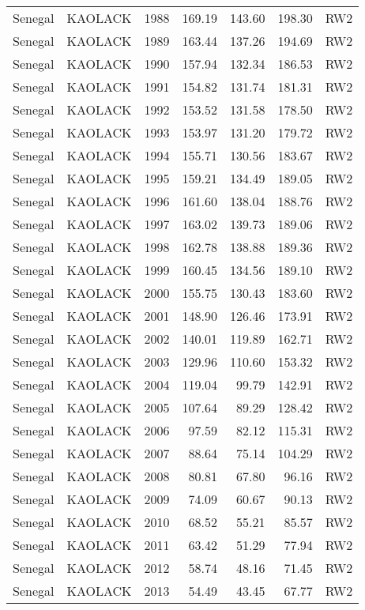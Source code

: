 \begin{longtable}{lllrrrl}
  Senegal & KAOLACK & 1988 & 169.19 & 143.60 & 198.30 & RW2 \\ 
  Senegal & KAOLACK & 1989 & 163.44 & 137.26 & 194.69 & RW2 \\ 
  Senegal & KAOLACK & 1990 & 157.94 & 132.34 & 186.53 & RW2 \\ 
  Senegal & KAOLACK & 1991 & 154.82 & 131.74 & 181.31 & RW2 \\ 
  Senegal & KAOLACK & 1992 & 153.52 & 131.58 & 178.50 & RW2 \\ 
  Senegal & KAOLACK & 1993 & 153.97 & 131.20 & 179.72 & RW2 \\ 
  Senegal & KAOLACK & 1994 & 155.71 & 130.56 & 183.67 & RW2 \\ 
  Senegal & KAOLACK & 1995 & 159.21 & 134.49 & 189.05 & RW2 \\ 
  Senegal & KAOLACK & 1996 & 161.60 & 138.04 & 188.76 & RW2 \\ 
  Senegal & KAOLACK & 1997 & 163.02 & 139.73 & 189.06 & RW2 \\ 
  Senegal & KAOLACK & 1998 & 162.78 & 138.88 & 189.36 & RW2 \\ 
  Senegal & KAOLACK & 1999 & 160.45 & 134.56 & 189.10 & RW2 \\ 
  Senegal & KAOLACK & 2000 & 155.75 & 130.43 & 183.60 & RW2 \\ 
  Senegal & KAOLACK & 2001 & 148.90 & 126.46 & 173.91 & RW2 \\ 
  Senegal & KAOLACK & 2002 & 140.01 & 119.89 & 162.71 & RW2 \\ 
  Senegal & KAOLACK & 2003 & 129.96 & 110.60 & 153.32 & RW2 \\ 
  Senegal & KAOLACK & 2004 & 119.04 & 99.79 & 142.91 & RW2 \\ 
  Senegal & KAOLACK & 2005 & 107.64 & 89.29 & 128.42 & RW2 \\ 
  Senegal & KAOLACK & 2006 & 97.59 & 82.12 & 115.31 & RW2 \\ 
  Senegal & KAOLACK & 2007 & 88.64 & 75.14 & 104.29 & RW2 \\ 
  Senegal & KAOLACK & 2008 & 80.81 & 67.80 & 96.16 & RW2 \\ 
  Senegal & KAOLACK & 2009 & 74.09 & 60.67 & 90.13 & RW2 \\ 
  Senegal & KAOLACK & 2010 & 68.52 & 55.21 & 85.57 & RW2 \\ 
  Senegal & KAOLACK & 2011 & 63.42 & 51.29 & 77.94 & RW2 \\ 
  Senegal & KAOLACK & 2012 & 58.74 & 48.16 & 71.45 & RW2 \\ 
  Senegal & KAOLACK & 2013 & 54.49 & 43.45 & 67.77 & RW2 \\ 

\end{longtable}
